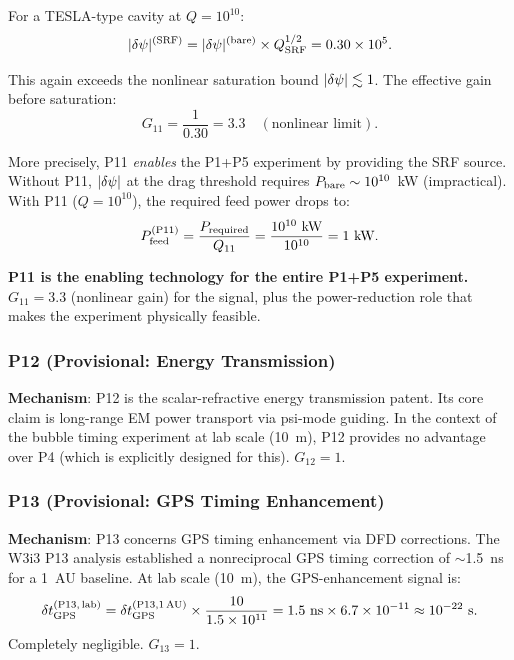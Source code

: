 For a TESLA-type cavity at $Q = 10^{10}$:
\begin{equation}
|\delta\psi|^{(\rm SRF)} = |\delta\psi|^{(\rm bare)} \times Q_{\rm SRF}^{1/2} = 0.30\times10^5.
\label{eq:SRF_amplitude_naive}
\end{equation}

This again exceeds the nonlinear saturation bound $|\delta\psi| \lesssim 1$. The
effective gain before saturation:
\begin{equation}
G_{11} = \frac{1}{0.30} = 3.3 \quad (\text{nonlinear limit}).
\label{eq:G11}
\end{equation}

More precisely, P11 \emph{enables} the P1+P5 experiment by providing the
SRF source. Without P11, $|\delta\psi|$ at the drag threshold requires
$P_{\rm bare} \sim 10^{10}$~kW (impractical). With P11 ($Q = 10^{10}$),
the required feed power drops to:
\begin{equation}
P_{\rm feed}^{(\rm P11)} = \frac{P_{\rm required}}{Q_{11}}
= \frac{10^{10}~\text{kW}}{10^{10}} = 1~\text{kW}.
\label{eq:P11_power_reduction}
\end{equation}

\textbf{P11 is the enabling technology for the entire P1+P5 experiment.}
$G_{11} = 3.3$ (nonlinear gain) for the signal, plus the power-reduction
role that makes the experiment physically feasible.

\subsubsection*{P12 (Provisional: Energy Transmission)}

\textbf{Mechanism}: P12 is the scalar-refractive energy transmission patent.
Its core claim is long-range EM power transport via psi-mode guiding. In the
context of the bubble timing experiment at lab scale (10~m), P12 provides
no advantage over P4 (which is explicitly designed for this). $G_{12} = 1$.

\subsubsection*{P13 (Provisional: GPS Timing Enhancement)}

\textbf{Mechanism}: P13 concerns GPS timing enhancement via DFD corrections.
The W3i3 P13 analysis established a nonreciprocal GPS timing correction of
$\sim$1.5~ns for a 1~AU baseline. At lab scale (10~m), the GPS-enhancement
signal is:
\begin{equation}
\delta t_{\rm GPS}^{(\rm P13,\,lab)} = \delta t_{\rm GPS}^{(\rm P13,1\,AU)}
\times \frac{10}{1.5\times 10^{11}} = 1.5~\text{ns} \times 6.7\times 10^{-11} \approx 10^{-22}~\text{s}.
\label{eq:P13_lab}
\end{equation}
Completely negligible. $G_{13} = 1$.

